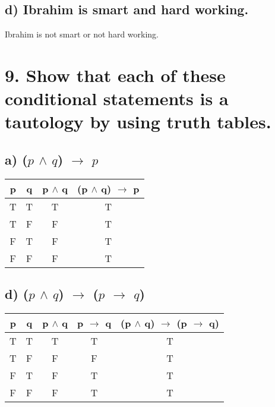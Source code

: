 \documentclass[11pt, oneside]{article} %
\numberwithin{equation}{section} %
\numberwithin{figure}{section} %
\numberwithin{table}{section} %
\begin{document}
\subsection{d) Ibrahim is smart and hard working.}
Ibrahim is not smart or not hard working.


\begin{table}[!htp]
\section{9. Show that each of these conditional statements is a tautology by using truth tables.}
\subsection{a) ($p$ $\wedge$ $q$) $\rightarrow$ $p$}
\begin{tabular}{c c c c}
\hline\hline
p & q & p $\wedge$ q & (p $\wedge$ q) $\rightarrow$ p \\ [0.5ex] %
\hline
T & T & T & T\\
T & F & F & T\\
F & T & F & T\\
F & F & F & T\\ [1ex]
\hline
\end{tabular}
\label{table:nonlin}
\end{table}

\begin{table}[!htp]
\subsection{d) ($p$ $\wedge$ $q$) $\rightarrow$ ($p$  $\rightarrow$ $q$)}
\begin{tabular}{c c c c c}
\hline\hline
p & q & p $\wedge$ q & p $\rightarrow$ q & (p $\wedge$ q) $\rightarrow$ (p  $\rightarrow$ q) \\ [0.5ex] %
\hline
T & T & T & T & T\\
T & F & F & F & T\\
F & T & F & T & T\\
F & F & F & T & T\\ [1ex]
\hline
\end{tabular}
\label{table:nonlin}
\end{table}
\end{document}
